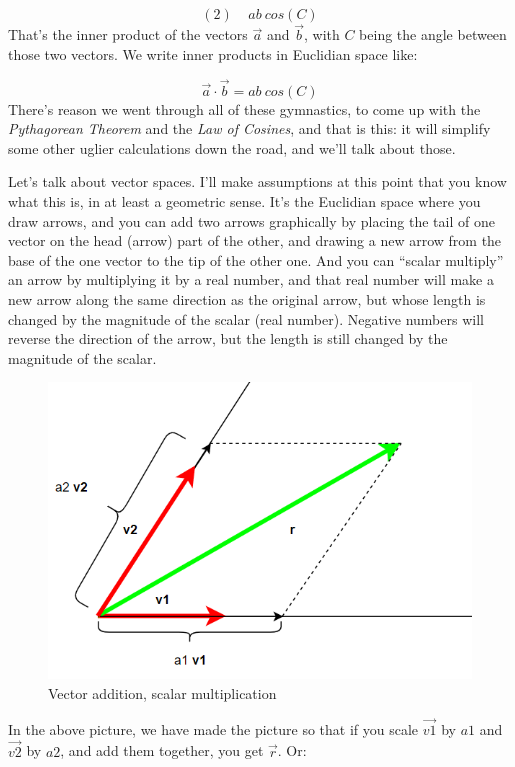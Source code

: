 \documentclass[
]{book}
\begin{document}
\[(2) \ \ \ \ \ a b \ cos(C)\]
That's the inner product of the vectors \(\vec{a}\) and \(\vec{b}\), with \(C\) being the angle between those two vectors. We write inner products in Euclidian space like:

\[\vec{a}\cdot\vec{b} = a b \ cos(C)\]
There's reason we went through all of these gymnastics, to come up with the \emph{Pythagorean Theorem} and the \emph{Law of Cosines}, and that is this: it will simplify some other uglier calculations down the road, and we'll talk about those.

Let's talk about vector spaces. I'll make assumptions at this point that you know what this is, in at least a geometric sense. It's the Euclidian space where you draw arrows, and you can add two arrows graphically by placing the tail of one vector on the head (arrow) part of the other, and drawing a new arrow from the base of the one vector to the tip of the other one. And you can ``scalar multiply'' an arrow by multiplying it by a real number, and that real number will make a new arrow along the same direction as the original arrow, but whose length is changed by the magnitude of the scalar (real number). Negative numbers will reverse the direction of the arrow, but the length is still changed by the magnitude of the scalar.

\begin{figure}

{\centering \includegraphics[width=0.75\linewidth,height=0.75\textheight]{images/parallelogram-decomposition} 

}

\caption{Vector addition, scalar multiplication}\label{fig:unnamed-chunk-4}
\end{figure}

In the above picture, we have made the picture so that if you scale \(\vec{v1}\) by \(a1\) and \(\vec{v2}\) by \(a2\), and add them together, you get \(\vec{r}\). Or:
\end{document}
